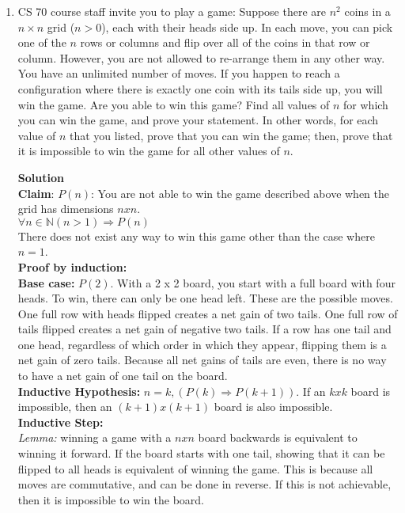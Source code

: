 \documentclass[11pt]{article}
\newenvironment{Parts}{\begin{enumerate}[label=(\alph*)]}{\end{enumerate}}
\newcommand*{\Part}{\item}
\begin{document}
\begin{Parts}
\Part CS 70 course staff invite you to play a game: Suppose there are $n^2$ coins in a $n\times n$ grid ($n > 0$), each with their heads side up. In each move, you can pick one of the $n$ rows or columns and flip over all of the coins in that row or column. However, you are not allowed to re-arrange them in any other way. You have an unlimited number of moves. If you happen to reach a configuration where there is exactly one coin with its tails side up, you will win the game. Are you able to win this game? Find all values of $n$ for which you can win the game, and prove your statement. In other words, for each value of $n$ that you listed, prove that you can win the game; then, prove that it is impossible to win the game for all other values of $n$.

\begin{mdframed} \textbf{Solution} \\
\textbf{Claim}: $P(n)$: You are not able to win the game described above when the grid has dimensions $n x n$. \\
$\forall n \in \mathbb{N} (n > 1) \Rightarrow P(n)$ \\
There does not exist any way to win this game other than the case where $n = 1$. \\
\textbf{Proof by induction:} \\
\textbf{Base case:} $P(2)$. With a 2 x 2 board, you start with a full board with four heads. To win, there can only be one head left. These are the possible moves. One full row with heads flipped creates a net gain of two tails. One full row of tails flipped creates a net gain of negative two tails. If a row has one tail and one head, regardless of which order in which they appear, flipping them is a net gain of zero tails. Because all net gains of tails are even, there is no way to have a net gain of one tail on the board. \\
\textbf{Inductive Hypothesis:} $n = k, (P(k) \Rightarrow P(k+1))$. If an $k x k$ board is impossible, then an $(k+1) x (k+1)$ board is also impossible. \\
\textbf{Inductive Step:} \\
\textit{Lemma:} winning a game with a $n x n$ board backwards is equivalent to winning it forward. If the board starts with one tail, showing that it can be flipped to all heads is equivalent of winning the game. This is because all moves are commutative, and can be done in reverse. If this is not achievable, then it is impossible to win the board.\\

\end{mdframed}
\end{Parts}
\end{document}

